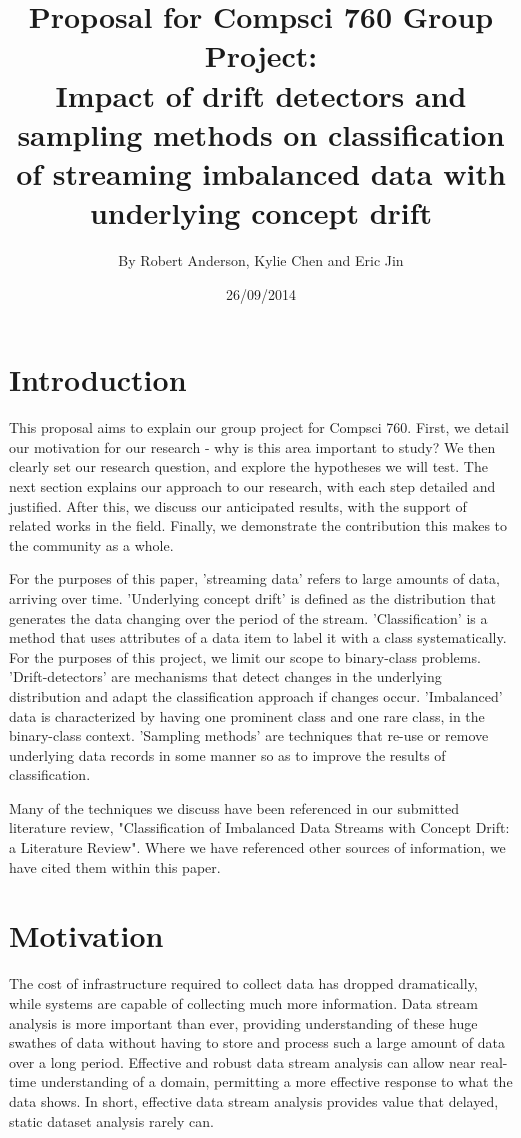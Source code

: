 \documentclass[11pt]{article}\usepackage[]{graphicx}\usepackage[]{color}
\title{\textbf{Proposal for Compsci 760 Group Project:} \\
Impact of drift detectors and sampling methods on classification of streaming imbalanced data with underlying concept drift}
\author{By Robert Anderson, Kylie Chen and Eric Jin}
\date{26/09/2014}
\begin{document}
\maketitle


\section{Introduction}

This proposal aims to explain our group project for Compsci 760. First, we detail our motivation for our research - why is this area important to study? We then clearly set our research question, and explore the hypotheses we will test. The next section explains our approach to our research, with each step detailed and justified. After this, we discuss our anticipated results, with the support of related works in the field. Finally, we demonstrate the contribution this makes to the community as a whole.

For the purposes of this paper, 'streaming data' refers to large amounts of data, arriving over time. 'Underlying concept drift' is defined as the distribution that generates the data changing over the period of the stream. 'Classification' is a method that uses attributes of a data item to label it with a class systematically. For the purposes of this project, we limit our scope to binary-class problems. 'Drift-detectors' are mechanisms that detect changes in the underlying distribution and adapt the classification approach if changes occur. 'Imbalanced' data is characterized by having one prominent class and one rare class, in the binary-class context.  'Sampling methods' are techniques that re-use or remove underlying data records in some manner so as to improve the results of classification.

Many of the techniques we discuss have been referenced in our submitted literature review, "Classification of Imbalanced Data Streams with Concept Drift: a Literature Review". Where we have referenced other sources of information, we have cited them within this paper.

\section{Motivation}

The cost of infrastructure required to collect data has dropped dramatically, while systems are capable of collecting much more information. Data stream analysis is more important than ever, providing understanding of these huge swathes of data without having to store and process such a large amount of data over a long period. Effective and robust data stream analysis can allow near real-time understanding of a domain, permitting a more effective response to what the data shows. In short, effective data stream analysis provides value that delayed, static dataset analysis rarely can.
\end{document}
